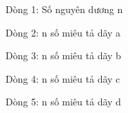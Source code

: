 Dòng 1: Số nguyên dương n  

   Dòng 2: n số miêu tả dãy a  

   Dòng 3: n số miêu tả dãy b  

   Dòng 4: n số miêu tả dãy c  

   Dòng 5: n số miêu tả dãy d